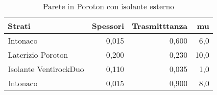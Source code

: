 \begin{table}
\centering
\caption{Parete in Poroton con isolante esterno}
\begin{tabular}{lrrr}
\toprule
                Strati & Spessori & Trasmitttanza &    mu \\
\midrule
              Intonaco &    0,015 &         0,600 &   6,0 \\
     Laterizio Poroton &    0,200 &         0,230 &  10,0 \\
 Isolante VentirockDuo &    0,110 &         0,035 &   1,0 \\
              Intonaco &    0,015 &         0,900 &   8,0 \\
\bottomrule
\end{tabular}
\end{table}
